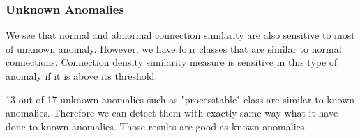 %
\newpage
\subsubsection{Unknown Anomalies}
We see that normal and abnormal connection similarity are also sensitive to most of unknown anomaly. 
However, we have four classes that are similar to normal connections. 
Connection density similarity measure is sensitive in this type of anomaly if it is above its threshold. 

13 out of 17 unknown anomalies such as "processtable" class are similar to known anomalies. 
Therefore we can detect them with exactly same way what it have done to known anomalies. 
Those results are good as known anomalies. 

